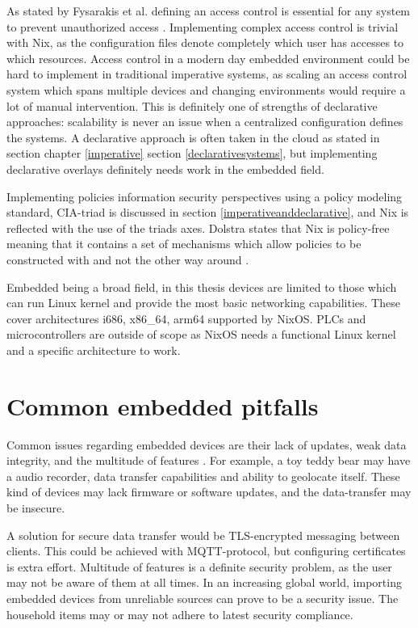 As stated by Fysarakis et al. defining an access control is essential
for any system to prevent unauthorized access
\cite{fysarakis2014embedded}. Implementing complex access control is
trivial with Nix, as the configuration files denote completely which
user has accesses to which resources. Access control in a modern day
embedded environment could be hard to implement in traditional
imperative systems, as scaling an access control system which spans
multiple devices and changing environments would require a lot of
manual intervention. This is definitely one of strengths of
declarative approaches: scalability is never an issue when a
centralized configuration defines the systems. A declarative approach
is often taken in the cloud as stated in section chapter
\ref{imperative} section \ref{declarativesystems}, but implementing
declarative overlays definitely needs work in the embedded field.

Implementing policies information security perspectives using a policy
modeling standard, CIA-triad is discussed in section
\ref{imperativeanddeclarative}, and Nix is reflected with the use of
the triads axes. Dolstra states that Nix is policy-free meaning that
it contains a set of mechanisms which allow policies to be constructed
with and not the other way around \cite{dolstra2004nix}.

Embedded being a broad field, in this thesis devices are limited to
those which can run Linux kernel and provide the most basic networking
capabilities. These cover architectures i686, x86\_64, arm64 supported
by NixOS. PLCs and microcontrollers are outside of scope as NixOS
needs a functional Linux kernel and a specific architecture to work.

\section{Common embedded pitfalls}

Common issues regarding embedded devices are their lack of updates,
weak data integrity, and the multitude of features
\cite{kemmerer2003cybersecurity, fysarakis2014embedded}. For example,
a toy teddy bear may have a audio recorder, data transfer capabilities
and ability to geolocate itself. These kind of devices may lack
firmware or software updates, and the data-transfer may be insecure.

A solution for secure data transfer would be TLS-encrypted messaging
between clients. This could be achieved with MQTT-protocol, but
configuring certificates is extra effort. Multitude of features is a
definite security problem, as the user may not be aware of them at all
times. In an increasing global world, importing embedded devices from
unreliable sources can prove to be a security issue. The household
items may or may not adhere to latest security
compliance. \cite{fysarakis2014embedded}


